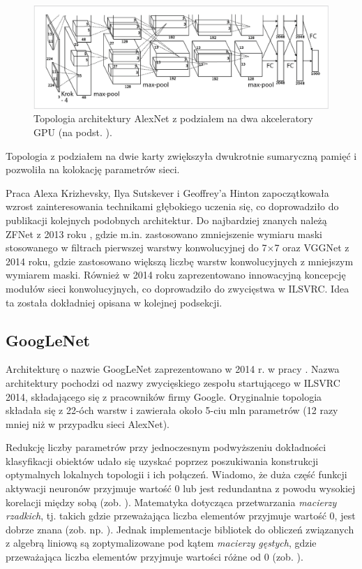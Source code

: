 \begin{figure}[h!]
	\centering
	\includegraphics[width=1\textwidth]{figures/AlexNet-multiGPU.png}
	\caption{Topologia architektury AlexNet z podziałem na dwa akceleratory GPU (na podst. \cite{Krizhevsky2012}).}
	\label{AlexNetTopologyMultiGPU}
\end{figure}

Topologia z podziałem na dwie karty zwiększyła dwukrotnie sumaryczną pamięć i pozwoliła na kolokację parametrów sieci.

Praca Alexa Krizhevsky, Ilya Sutskever i Geoffrey'a Hinton zapoczątkowała wzrost zainteresowania technikami głębokiego uczenia się, co doprowadziło do publikacji kolejnych podobnych architektur. Do najbardziej znanych należą ZFNet z 2013 roku \cite{ZFNet}, gdzie m.in. zastosowano zmniejszenie wymiaru maski stosowanego w filtrach pierwszej warstwy konwolucyjnej do 7$\times$7 oraz VGGNet \cite{VGGNet} z 2014 roku, gdzie zastosowano większą liczbę warstw konwolucyjnych z mniejszym wymiarem maski. Również w 2014 roku zaprezentowano innowacyjną koncepcję modułów sieci konwolucyjnych, co doprowadziło do zwycięstwa w ILSVRC. Idea ta została dokładniej opisana w kolejnej podsekcji.

\subsection{GoogLeNet}
\label{googlenet}
Architekturę o nazwie GoogLeNet zaprezentowano w 2014 r. w pracy \cite{GoogleNet}. Nazwa architektury pochodzi od nazwy zwycięskiego zespołu startującego w ILSVRC 2014, składającego się z pracowników firmy Google. Oryginalnie topologia składała się z 22-óch warstw i zawierała około 5-ciu mln parametrów (12 razy mniej niż w przypadku sieci AlexNet). 

Redukcję liczby parametrów przy jednoczesnym podwyższeniu dokładności klasyfikacji obiektów udało się uzyskać poprzez poszukiwania konstrukcji optymalnych lokalnych topologii i ich połączeń. Wiadomo, że duża część funkcji aktywacji neuronów przyjmuje wartość 0 lub jest redundantna z powodu wysokiej korelacji między sobą (zob. \cite{DBLP:journals/corr/AroraBGM13}). Matematyka dotycząca przetwarzania \textit{macierzy rzadkich}, tj. takich gdzie przeważająca liczba elementów przyjmuje wartość 0, jest dobrze znana (zob. np. \cite{Umit2010}). Jednak implementacje bibliotek do obliczeń związanych z algebrą liniową są zoptymalizowane pod kątem \textit{macierzy gęstych}, gdzie przeważająca liczba elementów przyjmuje wartości różne od 0 (zob. \cite{Song:2014:SUM:2597652.2597670, Krizhevsky2012}). 

